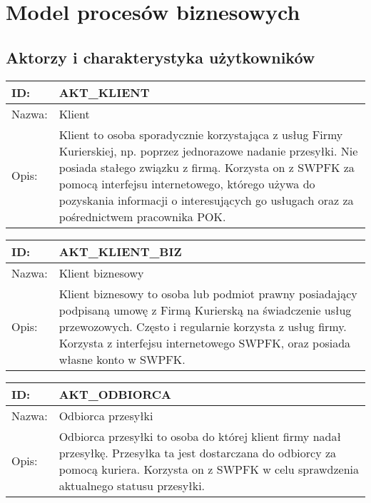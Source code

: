 \section{Model procesów biznesowych}

\subsection{Aktorzy i charakterystyka użytkowników}
\begin{center}
\begin{tabular}[h]{|p{1.6cm}|p{13.5cm}|}
\hline
ID: & AKT\_KLIENT \\ \hline
Nazwa: & Klient \\ \hline
Opis: & Klient to osoba sporadycznie korzystająca z usług Firmy Kurierskiej, np. poprzez jednorazowe nadanie przesyłki. Nie posiada stałego związku z firmą. Korzysta on z SWPFK za pomocą interfejsu internetowego, którego używa do pozyskania informacji o interesujących go usługach oraz za pośrednictwem pracownika POK. \\
\hline
\end{tabular}
\end{center}

\begin{center}
\begin{tabular}[h]{|p{1.6cm}|p{13.5cm}|}
\hline
ID: & AKT\_KLIENT\_BIZ \\ \hline
Nazwa: & Klient biznesowy \\ \hline
Opis: & Klient biznesowy to osoba lub podmiot prawny posiadający podpisaną umowę z Firmą Kurierską na świadczenie usług przewozowych. Często i regularnie korzysta z usług firmy. Korzysta z interfejsu internetowego SWPFK, oraz posiada własne konto w SWPFK.  \\
\hline
\end{tabular}
\end{center}

\begin{center}
\begin{tabular}[h]{|p{1.6cm}|p{13.5cm}|}
\hline
ID: & AKT\_ODBIORCA \\ \hline
Nazwa: & Odbiorca przesyłki \\ \hline
Opis: & Odbiorca przesyłki to osoba do której klient firmy nadał przesyłkę. Przesyłka ta jest dostarczana do odbiorcy za pomocą kuriera. Korzysta on z SWPFK w celu sprawdzenia aktualnego statusu przesyłki. \\
\hline
\end{tabular}
\end{center}


